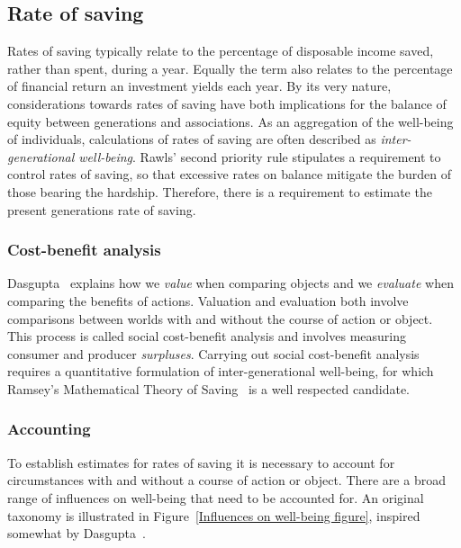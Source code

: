 \documentclass[11pt, oneside]{article}   	%
\begin{document}
\subsection{Rate of saving}
Rates of saving typically relate to the percentage of disposable income saved, rather than spent, during a year.
Equally the term also relates to the percentage of financial return an investment yields each year.
By its very nature, considerations towards rates of saving have both implications for the balance of equity between generations and associations.
As an aggregation of the well-being of individuals, calculations of rates of saving are often described as \emph{inter-generational well-being}.
Rawls' second priority rule stipulates a requirement to control rates of saving, so that excessive rates on balance mitigate the burden of those bearing the hardship.
Therefore, there is a requirement to estimate the present generations rate of saving.

\subsubsection{Cost-benefit analysis}

Dasgupta~\cite{pd2} explains how we \emph{value} when comparing objects and we \emph{evaluate} when comparing the benefits of actions.
Valuation and evaluation both involve comparisons between worlds with and without the course of action or object.
This process is called social cost-benefit analysis and involves measuring consumer and producer \emph{surpluses}.
Carrying out social cost-benefit analysis requires a quantitative formulation of inter-generational well-being, for which Ramsey's Mathematical Theory of Saving~\cite{fr1} is a well respected candidate.

\subsubsection{Accounting}

To establish estimates for rates of saving it is necessary to account for circumstances with and without a course of action or object. There are a broad range of influences on well-being that need to be accounted for. An original taxonomy is illustrated in Figure~\ref{Influences on well-being figure}, inspired somewhat by Dasgupta~\cite{pd3}.
\end{document}
